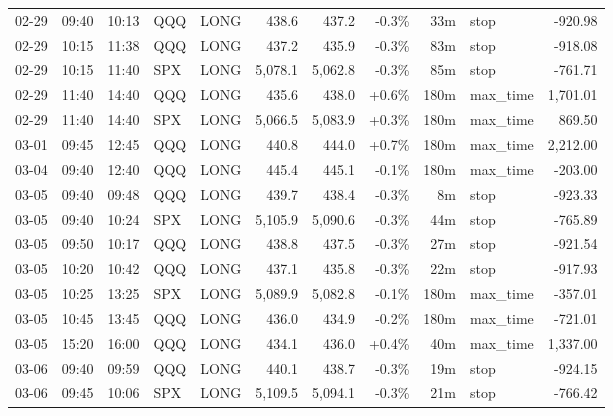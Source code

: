 \documentclass[11pt,a4paper,twoside]{article}
\begin{document}
\begin{center}
\begin{longtable}{>{\color{txtmain}}l l l l l r r r r >{\color{txtmain}}l r}
02-29 & 09:40 & 10:13 & QQQ & LONG & 438.6 & 437.2 & \textcolor{lossred}{-0.3\%} & 33m & stop & \textcolor{lossred}{-920.98} \\
02-29 & 10:15 & 11:38 & QQQ & LONG & 437.2 & 435.9 & \textcolor{lossred}{-0.3\%} & 83m & stop & \textcolor{lossred}{-918.08} \\
02-29 & 10:15 & 11:40 & SPX & LONG & 5,078.1 & 5,062.8 & \textcolor{lossred}{-0.3\%} & 85m & stop & \textcolor{lossred}{-761.71} \\
02-29 & 11:40 & 14:40 & QQQ & LONG & 435.6 & 438.0 & \textcolor{wingreen}{+0.6\%} & 180m & max\_time & \textcolor{wingreen}{1,701.01} \\
02-29 & 11:40 & 14:40 & SPX & LONG & 5,066.5 & 5,083.9 & \textcolor{wingreen}{+0.3\%} & 180m & max\_time & \textcolor{wingreen}{869.50} \\
03-01 & 09:45 & 12:45 & QQQ & LONG & 440.8 & 444.0 & \textcolor{wingreen}{+0.7\%} & 180m & max\_time & \textcolor{wingreen}{2,212.00} \\
03-04 & 09:40 & 12:40 & QQQ & LONG & 445.4 & 445.1 & \textcolor{lossred}{-0.1\%} & 180m & max\_time & \textcolor{lossred}{-203.00} \\
03-05 & 09:40 & 09:48 & QQQ & LONG & 439.7 & 438.4 & \textcolor{lossred}{-0.3\%} & 8m & stop & \textcolor{lossred}{-923.33} \\
03-05 & 09:40 & 10:24 & SPX & LONG & 5,105.9 & 5,090.6 & \textcolor{lossred}{-0.3\%} & 44m & stop & \textcolor{lossred}{-765.89} \\
03-05 & 09:50 & 10:17 & QQQ & LONG & 438.8 & 437.5 & \textcolor{lossred}{-0.3\%} & 27m & stop & \textcolor{lossred}{-921.54} \\
03-05 & 10:20 & 10:42 & QQQ & LONG & 437.1 & 435.8 & \textcolor{lossred}{-0.3\%} & 22m & stop & \textcolor{lossred}{-917.93} \\
03-05 & 10:25 & 13:25 & SPX & LONG & 5,089.9 & 5,082.8 & \textcolor{lossred}{-0.1\%} & 180m & max\_time & \textcolor{lossred}{-357.01} \\
03-05 & 10:45 & 13:45 & QQQ & LONG & 436.0 & 434.9 & \textcolor{lossred}{-0.2\%} & 180m & max\_time & \textcolor{lossred}{-721.01} \\
03-05 & 15:20 & 16:00 & QQQ & LONG & 434.1 & 436.0 & \textcolor{wingreen}{+0.4\%} & 40m & max\_time & \textcolor{wingreen}{1,337.00} \\
03-06 & 09:40 & 09:59 & QQQ & LONG & 440.1 & 438.7 & \textcolor{lossred}{-0.3\%} & 19m & stop & \textcolor{lossred}{-924.15} \\
03-06 & 09:45 & 10:06 & SPX & LONG & 5,109.5 & 5,094.1 & \textcolor{lossred}{-0.3\%} & 21m & stop & \textcolor{lossred}{-766.42} \\

\end{longtable}
\end{center}
\end{document}
